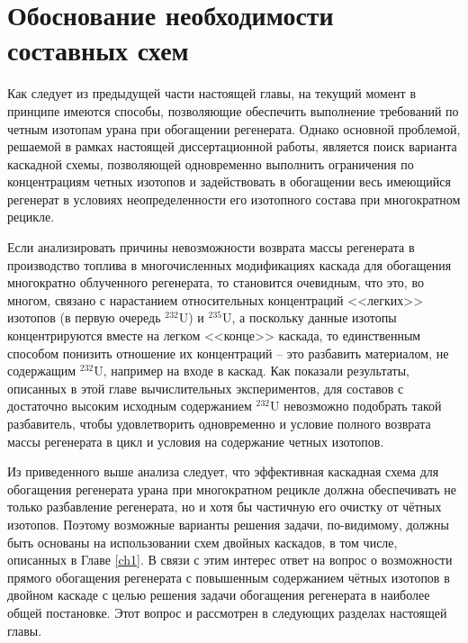 \section{Обоснование необходимости составных схем}\label{sec:ch2/sec2}

Как следует из предыдущей части настоящей главы, на текущий момент в принципе имеются способы, позволяющие обеспечить выполнение требований по четным изотопам урана при обогащении регенерата. Однако основной проблемой, решаемой в рамках настоящей диссертационной работы, является поиск варианта каскадной схемы, позволяющей одновременно выполнить ограничения по концентрациям четных изотопов и задействовать в обогащении весь имеющийся регенерат в условиях неопределенности его изотопного состава при многократном рецикле.

Если анализировать причины невозможности возврата массы регенерата в производство топлива в многочисленных модификациях каскада для обогащения многократно облученного регенерата, то становится очевидным, что это, во многом, связано с нарастанием относительных концентраций <<легких>> изотопов (в первую очередь $^{232}$U) и
$^{235}$U, а поскольку данные изотопы концентрируются вместе на легком <<конце>> каскада, то единственным способом понизить отношение их концентраций -- это разбавить материалом, не содержащим $^{232}$U, например на входе в каскад. Как показали результаты, описанных в этой главе вычислительных экспериментов, для составов с достаточно высоким исходным содержанием $^{232}$U невозможно подобрать такой разбавитель, чтобы удовлетворить одновременно и условие полного возврата массы регенерата в цикл и условия на содержание четных изотопов.

Из приведенного выше анализа следует, что эффективная каскадная схема для обогащения регенерата урана при многократном рецикле должна обеспечивать не только разбавление регенерата, но и хотя бы частичную его очистку от чётных изотопов. Поэтому возможные варианты решения задачи, по-видимому, должны быть основаны на использовании схем двойных каскадов, в том числе, описанных в Главе \ref{ch1}. В связи с этим интерес ответ на вопрос о возможности прямого обогащения регенерата с повышенным содержанием чётных изотопов в двойном каскаде с целью решения задачи обогащения регенерата в наиболее общей постановке. Этот вопрос и рассмотрен в следующих разделах настоящей главы.

\clearpage
